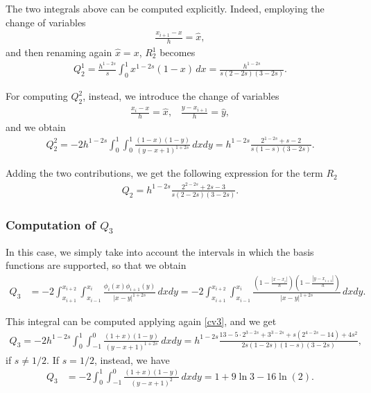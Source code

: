 {The two integrals above can be computed explicitly. Indeed, employing the change of variables
\begin{align}\label{cv2}
	\frac{x_{i+1}-x}{h}=\hat{x},
\end{align}
and then renaming again $\hat{x}=x$, $R_2^1$ becomes
\begin{align*}
	Q_2^1=\frac{h^{1-2s}}{s}\int_0^1 x^{1-2s}(1-x)\,dx = \frac{h^{1-2s}}{s(2-2s)(3-2s)}.
\end{align*}

For computing $Q_2^2$, instead, we introduce the change of variables
\begin{align}\label{cv3}
	\frac{x_i-x}{h}=\hat{x},\;\;\;\frac{y-x_{i+1}}{h}=\hat{y},
\end{align}
and we obtain
\begin{align*}
	Q_2^2 = -2h^{1-2s}\int_0^1\int_0^1\frac{(1-x)(1-y)}{(y-x+1)^{1+2s}}\,dxdy = h^{1-2s}\frac{2^{1-2s}+s-2}{s(1-s)(3-2s)}.
\end{align*}

Adding the two contributions, we get the following expression for the term $R_2$
\begin{align}\label{Q2}
	Q_2 = h^{1-2s}\frac{2^{2-2s}+2s-3}{s(2-2s)(3-2s)}.
\end{align}

\subsubsection*{Computation of $Q_3$}
In this case, we simply take into account the intervals in which the basis functions are supported, so that we obtain
\begin{align*}
	Q_3 &= -2\int_{x_{i+1}}^{x_{i+2}}\int_{x_{i-1}}^{x_i} \frac{\phi_i(x)\phi_{i+1}(y)}{|x-y|^{1+2s}}\,dxdy = - 2\int_{x_{i+1}}^{x_{i+2}}\int_{x_{i-1}}^{x_i} \frac{\left(1-\frac{|x-x_i|}{h}\right)\left(1-\frac{|y-x_{i+1}|}{h}\right)}{|x-y|^{1+2s}}\,dxdy.
\end{align*}

This integral can be computed applying again \eqref{cv3}, and we get
\begin{align}\label{Q3}
	Q_3 = -2h^{1-2s}\int_0^1\int_{-1}^0 \frac{(1+x)(1-y)}{(y-x+1)^{1+2s}}\,dxdy = h^{1-2s}\frac{13-5\cdot 2^{3-2s}+3^{3-2s}+s(2^{4-2s}-14)+4s^2}{2s(1-2s)(1-s)(3-2s)},
\end{align}
if $s\neq 1/2$. If $s=1/2$, instead, we have 
\begin{align*}
	Q_3 &= -2\int_0^1\int_{-1}^0 \frac{(1+x)(1-y)}{(y-x+1)^2}\,dxdy = 1+9\ln 3-16\ln(2).
\end{align*}

}
